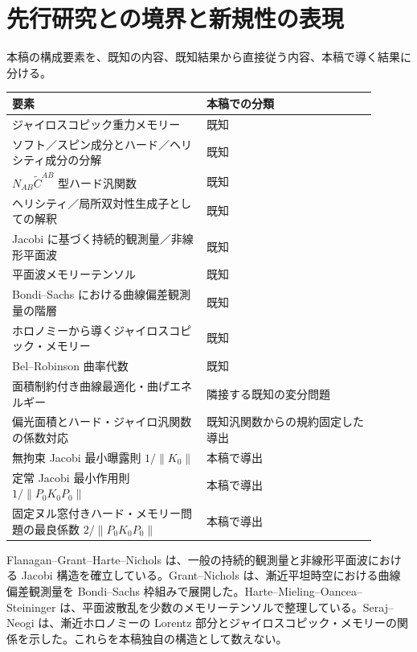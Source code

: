\section{先行研究との境界と新規性の表現}
本稿の構成要素を、既知の内容、既知結果から直接従う内容、本稿で導く結果に分ける。
\begin{center}
\begin{tabular}{p{0.48\linewidth}p{0.42\linewidth}}
\toprule
要素&本稿での分類\\
\midrule
ジャイロスコピック重力メモリー&既知\cite{SerajOblak2023}\\
ソフト／スピン成分とハード／ヘリシティ成分の分解&既知\cite{SerajOblak2023,FayeSeraj2025}\\
$N_{AB}\widetilde C^{AB}$ 型ハード汎関数&既知\cite{SerajOblak2023,FayeSeraj2025}\\
ヘリシティ／局所双対性生成子としての解釈&既知\cite{SerajOblak2023}\\
Jacobi に基づく持続的観測量／非線形平面波&既知\cite{Flanagan2019,Flanagan2020}\\
平面波メモリーテンソル&既知\cite{Harte2025}\\
Bondi--Sachs における曲線偏差観測量の階層&既知\cite{GrantNichols2022}\\
ホロノミーから導くジャイロスコピック・メモリー&既知\cite{SerajNeogi2023}\\
Bel--Robinson 曲率代数&既知\cite{FerrandoSaez2012}\\
面積制約付き曲線最適化・曲げエネルギー&隣接する既知の変分問題\cite{Hahmann2005,Ferone2016}\\
偏光面積とハード・ジャイロ汎関数の係数対応&既知汎関数からの規約固定した導出\\
無拘束 Jacobi 最小曝露則 $1/\|K_0\|$&本稿で導出\\
定常 Jacobi 最小作用則 $1/\|P_0K_0P_0\|$&本稿で導出\\
固定ヌル窓付きハード・メモリー問題の最良係数 $2/\|P_0K_0P_0\|$&本稿で導出\\
\bottomrule
\end{tabular}
\end{center}

Flanagan--Grant--Harte--Nichols は、一般の持続的観測量と非線形平面波における Jacobi 構造を確立している\cite{Flanagan2019,Flanagan2020}。Grant--Nichols は、漸近平坦時空における曲線偏差観測量を Bondi--Sachs 枠組みで展開した\cite{GrantNichols2022}。Harte--Mieling--Oancea--Steininger は、平面波散乱を少数のメモリーテンソルで整理している\cite{Harte2025}。Seraj--Neogi は、漸近ホロノミーの Lorentz 部分とジャイロスコピック・メモリーの関係を示した\cite{SerajNeogi2023}。これらを本稿独自の構造として数えない。

